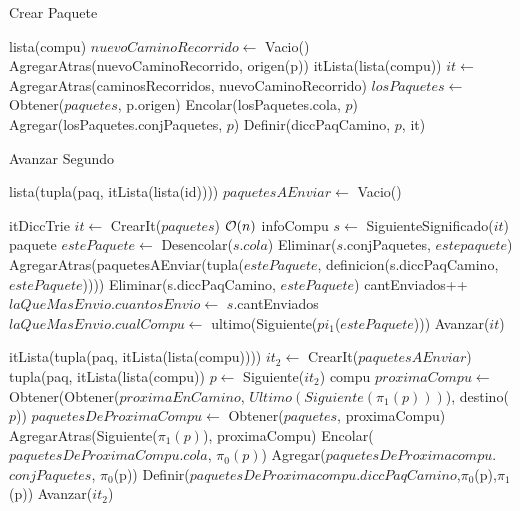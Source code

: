 \begin{Algoritmos}
\begin{algorithm}
\caption{Crear Paquete}
\begin{algorithmic}[1]
   \State lista(compu) $nuevoCaminoRecorrido \gets$ Vacio()
   \State AgregarAtras(nuevoCaminoRecorrido, origen(p))
   \State itLista(lista(compu)) $it \gets$ AgregarAtras(caminosRecorridos, nuevoCaminoRecorrido)
   \State $losPaquetes \gets $ Obtener($paquetes$, p.origen)
   \State Encolar(losPaquetes.cola, $p$)
   \State Agregar(losPaquetes.conjPaquetes, $p$)
   \State Definir(diccPaqCamino, $p$, it)
   \EndIf
   \EndProcedure
\end{algorithmic}
\end{algorithm}


\begin{algorithm}
\caption{Avanzar Segundo}
\begin{algorithmic}[1]
  
  \State lista(tupla(paq, itLista(lista(id)))) $paquetesAEnviar \gets$ Vacio()
  
  \State itDiccTrie $it \gets$ CrearIt($paquetes$)
   \Comment $\mathcal{O}(n)$
  	\State infoCompu $s \gets$ SiguienteSignificado($it$) 
  		\State paquete $estePaquete \gets$ Desencolar($s$.$cola$)
  		\State Eliminar($s$.conjPaquetes, $estepaquete$)
		\State AgregarAtras(paquetesAEnviar(tupla($estePaquete$, definicion(s.diccPaqCamino, $estePaquete$))))
		\State Eliminar(s.diccPaqCamino, $estePaquete$) 
		\State cantEnviados++
		   \State $laQueMasEnvio.cuantosEnvio \gets$ $s$.cantEnviados
		   \State $laQueMasEnvio.cualCompu \gets$ ultimo(Siguiente($pi_1$($estePaquete$)))
		\EndIf
	\EndIf
	\State Avanzar($it$)
  \EndWhile 
   
  \State itLista(tupla(paq, itLista(lista(compu)))) $it_2 \gets$ CrearIt($paquetesAEnviar$)
      \State tupla(paq, itLista(lista(compu)) $p \gets$ Siguiente($it_2$)
      \State compu $proximaCompu \gets$ Obtener(Obtener($proximaEnCamino$, $Ultimo(Siguiente(\pi_1(p)))$), destino($p$))
	\State $paquetesDeProximaCompu \gets$ Obtener($paquetes$, proximaCompu)
      	\State AgregarAtras(Siguiente($\pi_1(p)$), proximaCompu)
      	\State Encolar($paquetesDeProximaCompu$.$cola$, $\pi_0(p)$)
      	\State Agregar($paquetesDeProximacompu$.$conjPaquetes$, $\pi_0$(p))
	\State Definir($paquetesDeProximacompu.diccPaqCamino$,$\pi_0$(p),$\pi_1$(p))      
      \EndIf
      \State Avanzar($it_2$)
  \EndWhile
 

\end{algorithmic}
\end{algorithm}
\end{Algoritmos}
